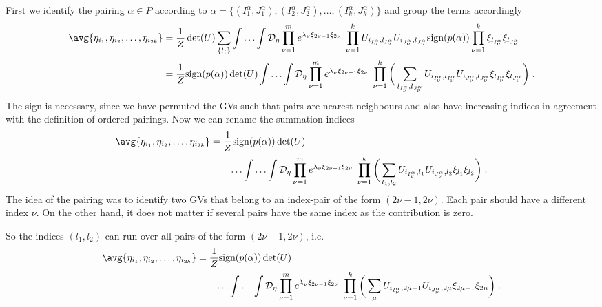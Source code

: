 First we identify the pairing $\alpha\in P$ according to 
$\alpha=\{(I_{1}^{\alpha},J_{1}^{\alpha}),(I_{2}^{\alpha},J_{2}^{\alpha}),\ldots,(I_{k}^{\alpha},J_{k}^{\alpha})\}$ and group the terms accordingly
%
\begin{align*}
\avg{\eta_{i_{1}},\eta_{i_{2}},\ldots, \eta_{i_{2k}} } &=
\frac{1}{Z}
    \det(U)      \sum_{\{l_{i}\}} 
    \Int \Deta 
    \prod_{\nu=1}^{m} e^{\lambda_{\nu} \xi_{2\nu-1}\xi_{2\nu}}\;
\prod_{\nu=1}^{k} U_{i_{I_{\nu}^{\alpha}},l_{I_{\nu}^{\alpha}} }
U_{i_{J_{\nu}^{\alpha}},l_{J_{\nu}^{\alpha}} }  
\text{sign}(p(\alpha))\prod_{\nu=1}^{k} \xi_{l_{I_{\nu}^{\alpha}} }\xi_{l_{J_{\nu}^{\alpha}} }\\
&=
\frac{1}{Z}\text{sign}(p(\alpha))
    \det(U)     
    \Int \Deta 
    \prod_{\nu=1}^{m} e^{\lambda_{\nu} \xi_{2\nu-1}\xi_{2\nu}}\;
\prod_{\nu=1}^{k}\bigg( \sum_{l_{I_{\nu}^{\alpha}},l_{J_{\nu}^{\alpha}}} U_{i_{I_{\nu}^{\alpha}},l_{I_{\nu}^{\alpha}} }
U_{i_{J_{\nu}^{\alpha}},l_{J_{\nu}^{\alpha}} }   \xi_{l_{I_{\nu}^{\alpha}} }
\xi_{l_{J_{\nu}^{\alpha}} }\bigg)\;.
%
\end{align*}
%
The sign is necessary, since we have permuted the GVs such that pairs are nearest neighbours
and also have increasing indices in agreement with the definition of ordered pairings.
Now we can rename the summation indices 
%
\begin{align*}
\avg{\eta_{i_{1}},\eta_{i_{2}},\ldots, \eta_{i_{2k}} } 
&=
\frac{1}{Z}\text{sign}(p(\alpha))    \det(U)     \\
&\qquad \ldots
    \Int \Deta 
    \prod_{\nu=1}^{m} e^{\lambda_{\nu} \xi_{2\nu-1}\xi_{2\nu}}\;
\prod_{\nu=1}^{k}\bigg( \sum_{l_1,l_{2}} U_{i_{I_{\nu}^{\alpha}},l_{1}}
U_{i_{J_{\nu}^{\alpha}},l_{2}}   \xi_{l_1}\xi_{l_2}\bigg)\;.
%
\end{align*}
%
The idea of the pairing was to identify two GVs that belong  to an index-pair of the form
$(2\nu-1,2\nu)$. Each pair should have a different index $\nu$. On the other hand, it does not matter if several pairs have the same index as the contribution is zero. 


So the indices
$(l_{1},l_{2})$ can run over all pairs of the form $(2\nu-1,2\nu)$, i.e.
%
\begin{align*}
\avg{\eta_{i_{1}},\eta_{i_{2}},\ldots, \eta_{i_{2k}} } 
&=
\frac{1}{Z}\text{sign}(p(\alpha))    \det(U)     \\
&\qquad \ldots
    \Int \Deta 
    \prod_{\nu=1}^{m} e^{\lambda_{\nu} \xi_{2\nu-1}\xi_{2\nu}}\;
\prod_{\nu=1}^{k}\bigg( \sum_{\mu} U_{i_{I_{\nu}^{\alpha}},2\mu-1}
U_{i_{J_{\nu}^{\alpha}},2\mu}   \xi_{2\mu-1}\xi_{2\mu}\bigg)\;.
\end{align*}
%





